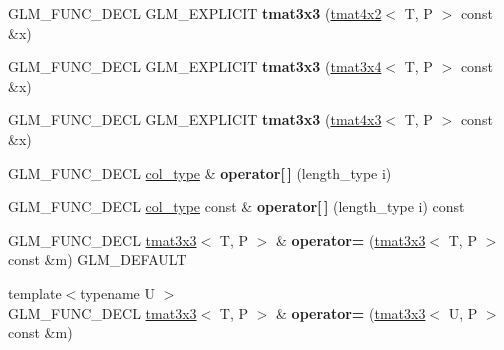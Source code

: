 \begin{DoxyCompactItemize}
\item 
\mbox{\label{structglm_1_1tmat3x3_ae8cd7af88bb36bd318cf96f86bc27725}} 
G\+L\+M\+\_\+\+F\+U\+N\+C\+\_\+\+D\+E\+CL G\+L\+M\+\_\+\+E\+X\+P\+L\+I\+C\+IT {\bfseries tmat3x3} (\hyperlink{structglm_1_1tmat4x2}{tmat4x2}$<$ T, P $>$ const \&x)
\item 
\mbox{\label{structglm_1_1tmat3x3_a1498a92906adaa18834058fbea37a808}} 
G\+L\+M\+\_\+\+F\+U\+N\+C\+\_\+\+D\+E\+CL G\+L\+M\+\_\+\+E\+X\+P\+L\+I\+C\+IT {\bfseries tmat3x3} (\hyperlink{structglm_1_1tmat3x4}{tmat3x4}$<$ T, P $>$ const \&x)
\item 
\mbox{\label{structglm_1_1tmat3x3_aca274ab9905b48dac255a6ae295dc193}} 
G\+L\+M\+\_\+\+F\+U\+N\+C\+\_\+\+D\+E\+CL G\+L\+M\+\_\+\+E\+X\+P\+L\+I\+C\+IT {\bfseries tmat3x3} (\hyperlink{structglm_1_1tmat4x3}{tmat4x3}$<$ T, P $>$ const \&x)
\item 
\mbox{\label{structglm_1_1tmat3x3_a168abb413d19f4ff78005b4a4015c9e1}} 
G\+L\+M\+\_\+\+F\+U\+N\+C\+\_\+\+D\+E\+CL \hyperlink{structglm_1_1tvec3}{col\+\_\+type} \& {\bfseries operator\mbox{[}$\,$\mbox{]}} (length\+\_\+type i)
\item 
\mbox{\label{structglm_1_1tmat3x3_ac5c2bd620ce28afd0fce23119765049e}} 
G\+L\+M\+\_\+\+F\+U\+N\+C\+\_\+\+D\+E\+CL \hyperlink{structglm_1_1tvec3}{col\+\_\+type} const  \& {\bfseries operator\mbox{[}$\,$\mbox{]}} (length\+\_\+type i) const
\item 
\mbox{\label{structglm_1_1tmat3x3_a6a587ae3bc7c9ad30a5d05a789a809db}} 
G\+L\+M\+\_\+\+F\+U\+N\+C\+\_\+\+D\+E\+CL \hyperlink{structglm_1_1tmat3x3}{tmat3x3}$<$ T, P $>$ \& {\bfseries operator=} (\hyperlink{structglm_1_1tmat3x3}{tmat3x3}$<$ T, P $>$ const \&m) G\+L\+M\+\_\+\+D\+E\+F\+A\+U\+LT
\item 
\mbox{\label{structglm_1_1tmat3x3_a4cfacf82df6bb99bca19076bfd27c3f9}} 
{\footnotesize template$<$typename U $>$ }\\G\+L\+M\+\_\+\+F\+U\+N\+C\+\_\+\+D\+E\+CL \hyperlink{structglm_1_1tmat3x3}{tmat3x3}$<$ T, P $>$ \& {\bfseries operator=} (\hyperlink{structglm_1_1tmat3x3}{tmat3x3}$<$ U, P $>$ const \&m)

\end{DoxyCompactItemize}
